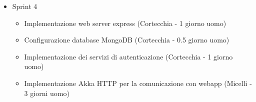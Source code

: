 \begin{itemize}
\begin{itemize}
          \end{itemize}
    \item Sprint 4
          \begin{itemize}
              \item Implementazione web server express (Cortecchia - 1 giorno uomo)
              \item Configurazione database MongoDB (Cortecchia - 0.5 giorno uomo)
              \item Implementazione dei servizi di autenticazione (Cortecchia - 1 giorno uomo)
              \item Implementazione Akka HTTP per la comunicazione con webapp (Micelli - 3 giorni uomo)
          \end{itemize}
\end{itemize}







\newpage





